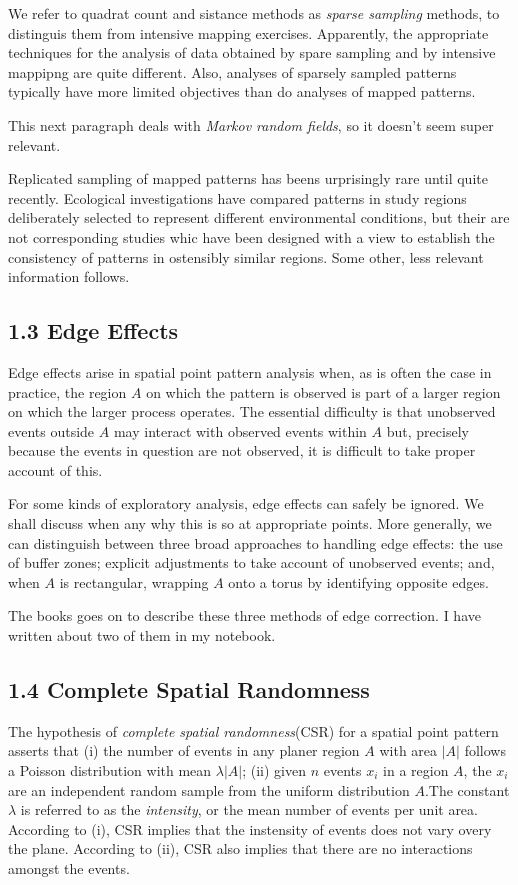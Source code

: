 \documentclass{article}
\begin{document}
We refer to quadrat count and sistance methods as {\it sparse sampling} methods, to distinguis them from intensive mapping exercises. Apparently, the appropriate techniques for the analysis of data obtained by spare sampling and by intensive mappipng are quite different. Also, analyses of sparsely sampled patterns typically have more limited objectives than do analyses of mapped patterns. 

This next paragraph deals with {\it Markov random fields}, so it doesn't seem super relevant. 

Replicated sampling of mapped patterns has beens urprisingly rare until quite recently. Ecological investigations have compared patterns in study regions deliberately selected to represent different environmental conditions, but their are not corresponding studies whic have been designed with a view to establish the consistency of patterns in ostensibly similar regions. Some other, less relevant information follows.
\subsection*{1.3 Edge Effects}
Edge effects arise in spatial point pattern analysis when, as is often the case in practice, the region $A$ on which the pattern is observed is part of a larger region on which the larger process operates. The essential difficulty is that unobserved events outside $A$ may interact with observed events within $A$ but, precisely because the events in question are not observed, it is difficult to take proper account of this. 

For some kinds of exploratory analysis, edge effects can safely be ignored. We shall discuss when any why this is so at appropriate points. More generally, we can distinguish between three broad approaches to handling edge effects: the use of buffer zones; explicit adjustments to take account of unobserved events; and, when $A$ is rectangular, wrapping $A$ onto a torus by identifying opposite edges. 

The books goes on to describe these  three methods of edge correction. I have written about two of them in my notebook. 
\subsection*{1.4 Complete Spatial Randomness}
The hypothesis of {\it complete spatial randomness}(CSR) for a spatial point pattern asserts that (i) the number of events in any planer region $A$ with area $|A|$ follows a Poisson distribution with mean $\lambda |A|$; (ii) given $n$ events $x_i$ in a region $A$, the $x_i$ are an independent random sample from the uniform distribution $A$.The constant $\lambda$ is referred to as the {\it intensity}, or the mean number of events per unit area. According to (i), CSR implies that the instensity of events does not vary overy the plane. According to (ii), CSR also implies that there are no interactions amongst the events. 
\end{document}
